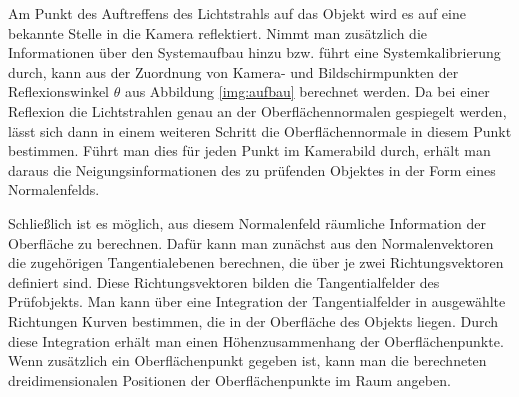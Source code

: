 \p
Am Punkt des Auftreffens des Lichtstrahls auf das Objekt wird es auf eine bekannte Stelle in die Kamera reflektiert.
Nimmt man zusätzlich die Informationen über den Systemaufbau hinzu bzw. führt eine Systemkalibrierung durch, kann aus der Zuordnung von Kamera- und Bildschirmpunkten der Reflexionswinkel $\theta$ aus Abbildung \ref{img:aufbau} berechnet werden.
Da bei einer Reflexion die Lichtstrahlen genau an der Oberflächennormalen gespiegelt werden, lässt sich dann in einem weiteren Schritt die Oberflächennormale in diesem Punkt bestimmen.
Führt man dies für jeden Punkt im Kamerabild durch, erhält man daraus die Neigungsinformationen des zu prüfenden Objektes in der Form eines Normalenfelds.

\p
Schließlich ist es möglich, aus diesem Normalenfeld räumliche Information der Oberfläche zu berechnen.
Dafür kann man zunächst aus den Normalenvektoren die zugehörigen Tangentialebenen berechnen, die über je zwei Richtungsvektoren definiert sind.
Diese Richtungsvektoren bilden die Tangentialfelder des Prüfobjekts.
Man kann über eine Integration der Tangentialfelder in ausgewählte Richtungen Kurven bestimmen, die in der Oberfläche des Objekts liegen.
Durch diese Integration erhält man einen Höhenzusammen\-hang der Oberflächenpunkte.
Wenn zusätzlich ein Oberflächenpunkt gegeben ist, kann man die berechneten dreidimensionalen Positionen der Oberflächenpunkte im Raum angeben.\cite{kit_werling}